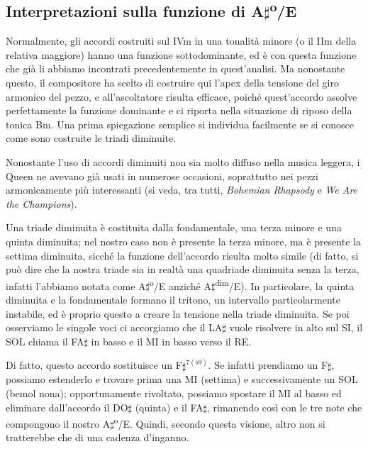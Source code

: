 \documentclass[12pt]{article}
\begin{document}
\subsection{Interpretazioni sulla funzione di A\(\sharp\)\textsuperscript{o}/E}
Normalmente, gli accordi costruiti sul IVm in una tonalità minore (o il IIm della relativa maggiore) hanno una funzione sottodominante, ed è con questa funzione che già li abbiamo incontrati precedentemente in quest'analisi. Ma nonostante questo, il compositore ha scelto di costruire qui l'apex della tensione del giro armonico del pezzo, e all'ascoltatore risulta efficace, poiché quest'accordo assolve perfettamente la funzione dominante e ci riporta nella situazione di riposo della tonica Bm. Una prima spiegazione semplice si individua facilmente se si conosce come sono costruite le triadi diminuite.

Nonostante l'uso di accordi diminuiti non sia molto diffuso nella musica leggera, i Queen ne avevano già usati in numerose occasioni, soprattutto nei pezzi armonicamente più interessanti (si veda, tra tutti, \emph{Bohemian Rhapsody} e \emph{We Are the Champions}).

Una triade diminuita è costituita dalla fondamentale, una terza minore e una quinta diminuita; nel nostro caso non è presente la terza minore, ma è presente la settima diminuita, sicché la funzione dell'accordo risulta molto simile (di fatto, si può dire che la nostra triade sia in realtà una quadriade diminuita senza la terza, infatti l'abbiamo notata come A\(\sharp\)\textsuperscript{o}/E anziché A\(\sharp\)\textsuperscript{dim}/E). In particolare, la quinta diminuita e la fondamentale formano il tritono, un intervallo particolarmente instabile, ed è proprio questo a creare la tensione nella triade diminuita. Se poi osserviamo le singole voci ci accorgiamo che il LA\(\sharp\) vuole risolvere in alto sul SI, il SOL chiama il FA\(\sharp\) in basso e il MI in basso verso il RE.

Di fatto, questo accordo sostituisce un F\(\sharp^{7(\flat9)}\). Se infatti prendiamo un F\(\sharp\), possiamo estenderlo e trovare prima una MI (settima) e successivamente un SOL (bemol nona); opportunamente rivoltato, possiamo spostare il MI al basso ed eliminare dall'accordo il DO\(\sharp\) (quinta) e il FA\(\sharp\), rimanendo così con le tre note che compongono il nostro A\(\sharp\)\textsuperscript{o}/E. Quindi, secondo questa visione, altro non si tratterebbe che di una cadenza d'inganno.
\end{document}
